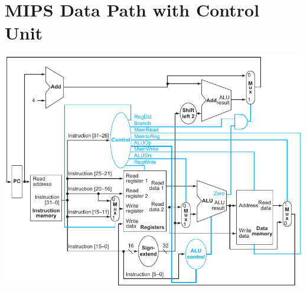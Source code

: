 \documentclass[11pt]{article}
\begin{document}
\begin{minipage}[t]{0.64\linewidth}
    \section*{MIPS Data Path with Control Unit}
    \centering
    \includegraphics[width=\linewidth]{content/fig417.pdf}
\end{minipage}
\end{document}
